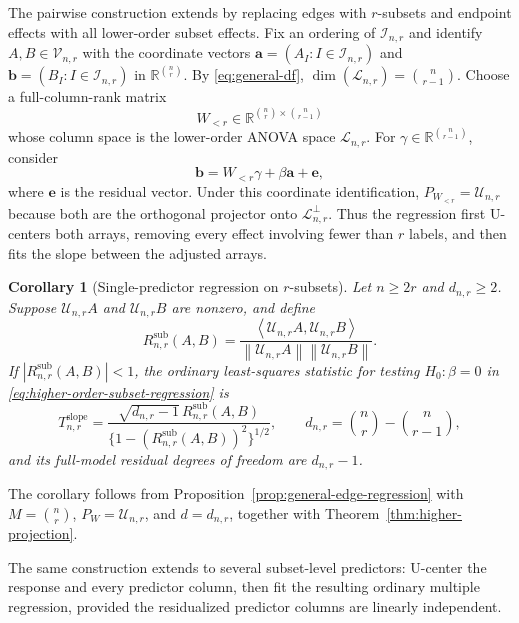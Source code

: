 \documentclass[11pt]{article}
\theoremstyle{plain}
\newtheorem{corollary}[theorem]{Corollary}
\theoremstyle{definition}
\theoremstyle{remark}
\newcommand{\R}{\mathbb R}
\newcommand{\cI}{\mathcal I}
\newcommand{\cU}{\mathcal U}
\newcommand{\cL}{\mathcal L}
\newcommand{\cV}{\mathcal V}
\newcommand{\inner}[2]{\left\langle #1,#2\right\rangle}
\newcommand{\norm}[1]{\left\lVert #1\right\rVert}
\begin{document}
The pairwise construction extends by replacing edges with $r$-subsets and
endpoint effects with all lower-order subset effects.  Fix an ordering of
$\cI_{n,r}$ and identify
$A,B\in\cV_{n,r}$ with the coordinate vectors
$\mathbf a=(A_I:I\in\cI_{n,r})$ and
$\mathbf b=(B_I:I\in\cI_{n,r})$ in $\R^{\binom nr}$.  By
\eqref{eq:general-df}, $\dim(\cL_{n,r})=\binom n{r-1}$.  Choose a
full-column-rank matrix
\[
 W_{<r}\in\R^{\binom nr\times\binom n{r-1}}
\]
whose column space is the lower-order ANOVA space $\cL_{n,r}$.  For
$\gamma\in\R^{\binom n{r-1}}$, consider
\begin{equation}
 \mathbf b=W_{<r}\gamma+\beta\mathbf a+\mathbf e,
 \label{eq:higher-order-subset-regression}
\end{equation}
where $\mathbf e$ is the residual vector.  Under this coordinate
identification, $P_{W_{<r}}=\cU_{n,r}$ because both
are the orthogonal projector onto $\cL_{n,r}^{\perp}$.  Thus the
regression first U-centers both arrays, removing every effect involving fewer
than $r$ labels, and then fits the slope between the adjusted arrays.

\begin{corollary}[Single-predictor regression on $r$-subsets]
\label{cor:higher-order-subset-regression}
Let $n\ge2r$ and $d_{n,r}\ge2$.  Suppose $\cU_{n,r}A$ and
$\cU_{n,r}B$ are nonzero, and define
\begin{equation}
 R_{n,r}^{\mathrm{sub}}(A,B)
 =\frac{\inner{\cU_{n,r}A}{\cU_{n,r}B}}
 {\norm{\cU_{n,r}A}\norm{\cU_{n,r}B}}.
 \label{eq:higher-order-residual-correlation}
\end{equation}
If $|R_{n,r}^{\mathrm{sub}}(A,B)|<1$, the ordinary least-squares statistic
for testing $H_0:\beta=0$ in
\eqref{eq:higher-order-subset-regression} is
\begin{equation}
 T_{n,r}^{\mathrm{slope}}
 =\frac{\sqrt{d_{n,r}-1}\,R_{n,r}^{\mathrm{sub}}(A,B)}
 {\{1-(R_{n,r}^{\mathrm{sub}}(A,B))^2\}^{1/2}},
 \qquad
 d_{n,r}=\binom nr-\binom n{r-1},
 \label{eq:higher-order-subset-t}
\end{equation}
and its full-model residual degrees of freedom are $d_{n,r}-1$.
\end{corollary}

The corollary follows from Proposition~\ref{prop:general-edge-regression} with
$M=\binom nr$, $P_W=\cU_{n,r}$, and $d=d_{n,r}$, together with
Theorem~\ref{thm:higher-projection}.

The same construction extends to several subset-level predictors: U-center
the response and every predictor column, then fit the resulting ordinary
multiple regression, provided the residualized predictor columns are linearly
independent.
\end{document}
